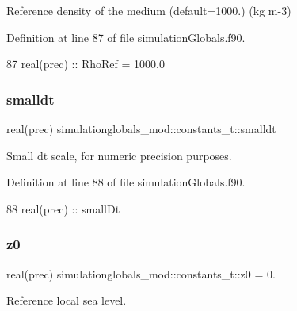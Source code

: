 Reference density of the medium (default=1000.) (kg m-\/3) 



Definition at line 87 of file simulation\+Globals.\+f90.


\begin{DoxyCode}
87         \textcolor{keywordtype}{real(prec)}   :: RhoRef = 1000.0
\end{DoxyCode}
\mbox{\label{structsimulationglobals__mod_1_1constants__t_a4e417855b60f5eb0f45d3094495f532b}} 
\subsubsection{\texorpdfstring{smalldt}{smalldt}}
{\footnotesize\ttfamily real(prec) simulationglobals\+\_\+mod\+::constants\+\_\+t\+::smalldt\hspace{0.3cm}{\ttfamily [private]}}



Small dt scale, for numeric precision purposes. 



Definition at line 88 of file simulation\+Globals.\+f90.


\begin{DoxyCode}
88         \textcolor{keywordtype}{real(prec)}   :: smallDt
\end{DoxyCode}
\mbox{\label{structsimulationglobals__mod_1_1constants__t_a9dab4143c1d5fd54c8337d78ea9b7d82}} 
\subsubsection{\texorpdfstring{z0}{z0}}
{\footnotesize\ttfamily real(prec) simulationglobals\+\_\+mod\+::constants\+\_\+t\+::z0 = 0.\hspace{0.3cm}{\ttfamily [private]}}



Reference local sea level. 



